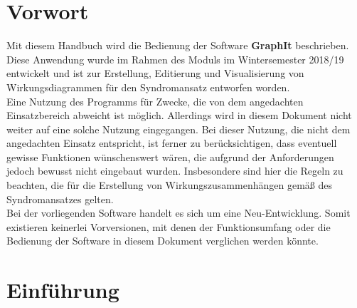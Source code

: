 \documentclass[enabledeprecatedfontcommands,fontsize=11pt,paper=a4,twoside]{scrartcl}
\newcounter{one}
\newcounter{two}[one]
\renewcommand{\headrulewidth}{0pt}
\begin{document}


\newpage

  \thispagestyle{fancy}
  \fancyhead{}
  
  \fancyfoot{}
  \renewcommand{\headrulewidth}{0.4pt}
  \tableofcontents

\newpage


\section*{Vorwort}
Mit diesem Handbuch wird die Bedienung der Software \textbf{GraphIt} beschrieben. Diese Anwendung wurde im Rahmen des Moduls \grqq im Wintersemester 2018/19 entwickelt und ist zur Erstellung, Editierung und Visualisierung von Wirkungsdiagrammen für den Syndromansatz entworfen worden. \\
Eine Nutzung des Programms für Zwecke, die von dem angedachten Einsatzbereich abweicht ist möglich. Allerdings wird in diesem Dokument nicht weiter auf eine solche Nutzung eingegangen. Bei dieser Nutzung, die nicht dem angedachten Einsatz entspricht, ist ferner zu berücksichtigen, dass eventuell gewisse Funktionen wünschenswert wären, die aufgrund der Anforderungen jedoch bewusst nicht eingebaut wurden. Insbesondere sind hier die Regeln zu beachten, die für die Erstellung von Wirkungszusammenhängen gemäß des Syndromansatzes gelten. \\
Bei der vorliegenden Software handelt es sich um eine Neu-Entwicklung. Somit existieren keinerlei Vorversionen, mit denen der Funktionsumfang oder die Bedienung der Software in diesem Dokument verglichen werden könnte. 

\section{Einführung}
\end{document}
